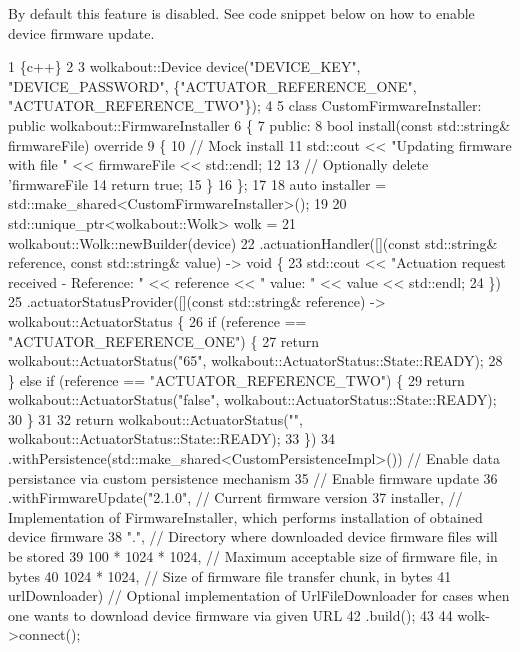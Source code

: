 By default this feature is disabled. See code snippet below on how to enable device firmware update.


\begin{DoxyCode}
1 \{c++\}
2 
3 wolkabout::Device device("DEVICE\_KEY", "DEVICE\_PASSWORD", \{"ACTUATOR\_REFERENCE\_ONE",
       "ACTUATOR\_REFERENCE\_TWO"\});
4 
5 class CustomFirmwareInstaller: public wolkabout::FirmwareInstaller
6 \{
7 public:
8     bool install(const std::string& firmwareFile) override
9     \{
10         // Mock install
11         std::cout << "Updating firmware with file " << firmwareFile << std::endl;
12 
13         // Optionally delete 'firmwareFile
14         return true;
15     \}
16 \};
17 
18 auto installer = std::make\_shared<CustomFirmwareInstaller>();
19 
20 std::unique\_ptr<wolkabout::Wolk> wolk =
21   wolkabout::Wolk::newBuilder(device)
22     .actuationHandler([](const std::string& reference, const std::string& value) -> void \{
23         std::cout << "Actuation request received - Reference: " << reference << " value: " << value <<
       std::endl;
24     \})
25     .actuatorStatusProvider([](const std::string& reference) -> wolkabout::ActuatorStatus \{
26         if (reference == "ACTUATOR\_REFERENCE\_ONE") \{
27             return wolkabout::ActuatorStatus("65", wolkabout::ActuatorStatus::State::READY);
28         \} else if (reference == "ACTUATOR\_REFERENCE\_TWO") \{
29             return wolkabout::ActuatorStatus("false", wolkabout::ActuatorStatus::State::READY);
30         \}
31 
32         return wolkabout::ActuatorStatus("", wolkabout::ActuatorStatus::State::READY);
33     \})
34     .withPersistence(std::make\_shared<CustomPersistenceImpl>()) // Enable data persistance via custom
       persistence mechanism
35     // Enable firmware update
36     .withFirmwareUpdate("2.1.0",                                // Current firmware version
37                         installer,                              // Implementation of FirmwareInstaller,
       which performs installation of obtained device firmware
38                         ".",                                    // Directory where downloaded device
       firmware files will be stored
39                         100 * 1024 * 1024,                      // Maximum acceptable size of firmware
       file, in bytes
40                         1024 * 1024,                            // Size of firmware file transfer chunk, in
       bytes
41                         urlDownloader)                          // Optional implementation of
       UrlFileDownloader for cases when one wants to download device firmware via given URL
42     .build();
43 
44     wolk->connect();
\end{DoxyCode}


